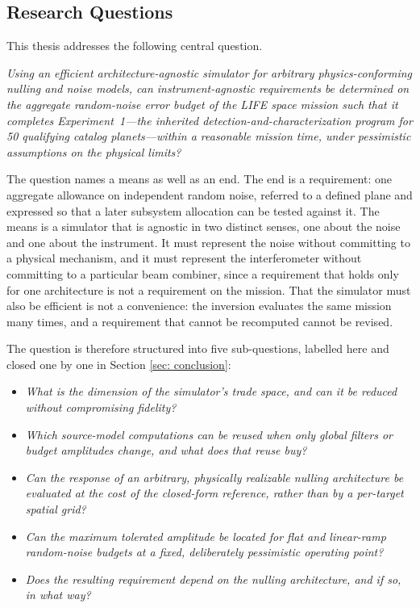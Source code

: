 \documentclass[12pt,a4paper]{article}
\numberwithin{equation}{section}
\numberwithin{figure}{section}
\numberwithin{table}{section}
\begin{document}
\subsection{Research Questions} \label{sec: intro: research questions}
This thesis addresses the following central question.

\textit{Using an efficient architecture-agnostic simulator for arbitrary physics-conforming nulling and noise models, can instrument-agnostic requirements be determined on the aggregate random-noise error budget of the LIFE space mission such that it completes Experiment~1---the inherited detection-and-characterization program for 50 qualifying catalog planets---within a reasonable mission time, under pessimistic assumptions on the physical limits?}

The question names a means as well as an end. The end is a requirement: one aggregate allowance on independent random noise, referred to a defined plane and expressed so that a later subsystem allocation can be tested against it. The means is a simulator that is agnostic in two distinct senses, one about the noise and one about the instrument. It must represent the noise without committing to a physical mechanism, and it must represent the interferometer without committing to a particular beam combiner, since a requirement that holds only for one architecture is not a requirement on the mission. That the simulator must also be efficient is not a convenience: the inversion evaluates the same mission many times, and a requirement that cannot be recomputed cannot be revised.

The question is therefore structured into five sub-questions, labelled here and closed one by one in Section \ref{sec: conclusion}:
\begin{itemize}
    \item[\textbf{Q1}] \textit{What is the dimension of the simulator's trade space, and can it be reduced without compromising fidelity?}
    \item[\textbf{Q2}] \textit{Which source-model computations can be reused when only global filters or budget amplitudes change, and what does that reuse buy?}
    \item[\textbf{Q3}] \textit{Can the response of an arbitrary, physically realizable nulling architecture be evaluated at the cost of the closed-form reference, rather than by a per-target spatial grid?}
    \item[\textbf{Q4}] \textit{Can the maximum tolerated amplitude be located for flat and linear-ramp random-noise budgets at a fixed, deliberately pessimistic operating point?}
    \item[\textbf{Q5}] \textit{Does the resulting requirement depend on the nulling architecture, and if so, in what way?}
\end{itemize}
\end{document}
